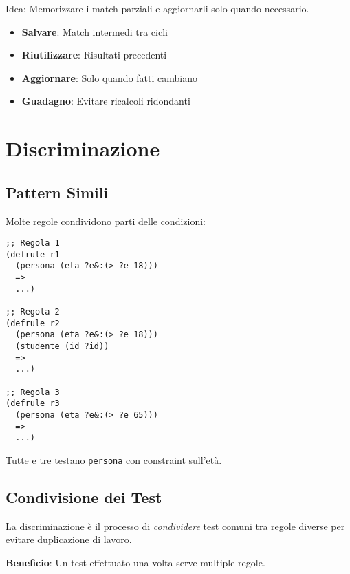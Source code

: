 Idea: Memorizzare i match parziali e aggiornarli solo quando necessario.

\begin{infobox}
\begin{itemize}
\item \textbf{Salvare}: Match intermedi tra cicli
\item \textbf{Riutilizzare}: Risultati precedenti
\item \textbf{Aggiornare}: Solo quando fatti cambiano
\item \textbf{Guadagno}: Evitare ricalcoli ridondanti
\end{itemize}
\end{infobox}

\section{Discriminazione}

\subsection{Pattern Simili}

Molte regole condividono parti delle condizioni:

\begin{lstlisting}[language=CLIPS]
;; Regola 1
(defrule r1
  (persona (eta ?e&:(> ?e 18)))
  =>
  ...)

;; Regola 2  
(defrule r2
  (persona (eta ?e&:(> ?e 18)))
  (studente (id ?id))
  =>
  ...)

;; Regola 3
(defrule r3
  (persona (eta ?e&:(> ?e 65)))
  =>
  ...)
\end{lstlisting}

Tutte e tre testano \texttt{persona} con constraint sull'età.

\subsection{Condivisione dei Test}

\begin{definizione}[Discriminazione]
La discriminazione è il processo di \textit{condividere} test comuni tra regole diverse per evitare duplicazione di lavoro.
\end{definizione}

\textbf{Beneficio}: Un test effettuato una volta serve multiple regole.

